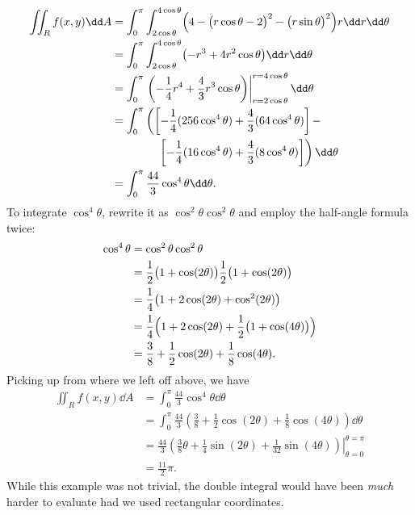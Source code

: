 \begin{example}
{\allowdisplaybreaks
\begin{align*}
\iint_Rf(x,y)\dd A
	&= \int_0^{\pi}\int_{2\cos\theta}^{4\cos\theta} \Bigl(4-\bigl(r\cos\theta-2\bigr)^2-\bigl(r\sin\theta\bigr)^2\Bigr)r\dd r\dd\theta\\
	&= \int_0^{\pi}\int_{2\cos\theta}^{4\cos\theta} \bigl(-r^3+4r^2\cos \theta\bigr)\dd r\dd\theta\\
	&= \int_0^\pi \left.\left(-\frac14r^4+\frac43r^3\cos\theta\right)\right|_{r=2\cos\theta}^{r=4\cos\theta}\dd\theta\\
	&=\int_0^\pi \left(\left[-\frac14(256\cos^4\theta)+\frac43(64\cos^4\theta)\right]-\right.\\
	&\qquad\qquad\left.\left[-\frac14(16\cos^4\theta)+\frac43(8\cos^4\theta)\right]\right)\dd\theta\\
	&=\int_0^\pi\frac{44}3\cos^4\theta\dd\theta.
\end{align*}}
To integrate $\cos^4\theta$, rewrite it as $\cos^2\theta\cos^2\theta$ and employ the half-angle formula twice:
\begin{align*}
	\cos^4\theta &=\cos^2\theta\cos^2\theta\\
	&= \frac12\bigl(1+\cos(2\theta)\bigr)\frac12\bigl(1+\cos(2\theta)\bigr) \\
	&= \frac14\bigl(1+2\cos(2\theta)+\cos^2(2\theta)\bigr)\\
	&=\frac14\Bigl(1+2\cos(2\theta)+\frac12\bigl(1+\cos(4\theta)\bigr)\Bigr)\\
	&= \frac38+\frac12\cos(2\theta)+\frac18\cos(4\theta).
\end{align*}
Picking up from where we left off above, we have
\begin{align*}
\iint_Rf(x,y)\dd A &=\int_0^\pi\frac{44}3\cos^4\theta\dd\theta\\
	&=\int_0^\pi \frac{44}3\left(\frac38+\frac12\cos(2\theta)+\frac18\cos(4\theta)\right)\dd\theta\\
	&= \left.\frac{44}3\left(\frac{3}8\theta+\frac14\sin(2\theta)+\frac{1}{32}\sin(4\theta)\right)\right|_{\theta=0}^{\theta=\pi}\\
	&=\frac{11}2\pi%
	.
\end{align*}
While this example was not trivial, the double integral would have been \emph{much} harder to evaluate had we used rectangular coordinates.
\end{example}

